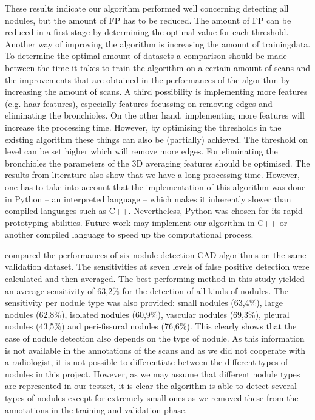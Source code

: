 These results indicate our algorithm performed well concerning detecting all
nodules, but the amount of FP has to be reduced. The amount of FP can be reduced
in a first stage by determining the optimal value for each threshold.
Another way of improving the algorithm is increasing the amount of trainingdata.
To determine the optimal amount of datasets a comparison should be made between
the time it takes to train the algorithm on a certain amount of scans and the
improvements that are obtained in the performances of the algorithm by
increasing the amount of scans. A third possibility is implementing more
features (e.g. haar features), especially features focussing on removing edges
and eliminating the bronchioles. On the other hand, implementing more features
will increase the processing time. However, by optimising the thresholds in the
existing algorithm these things can also be (partially) achieved. The threshold
on level can be set higher which will remove more edges. For eliminating the
bronchioles the parameters of the 3D averaging features should be optimised. The
results from literature also show that we have a long processing time. However,
one has to take into account that the implementation of this algorithm was done
in Python -- an interpreted language -- which makes it inherently slower than
compiled languages such as C++. Nevertheless, Python was chosen for its rapid
prototyping abilities. Future work may implement our algorithm in C++ or another
compiled language to speed up the computational process.


\cite{ginneken} compared the performances of six nodule detection CAD algorithms
on the same validation dataset. The sensitivities at seven levels of false
positive detection were calculated and then averaged. The best performing method
in this study yielded an average sensitivity of 63,2\% for the detection of all
kinds of nodules. The sensitivity per nodule type was also provided: small
nodules (63,4\%), large nodules (62,8\%), isolated nodules (60,9\%), vascular
nodules (69,3\%), pleural nodules (43,5\%) and peri-fissural nodules (76,6\%).
This clearly shows that the ease of nodule detection also depends on the type of
nodule. As this information is not available in the annotations of the scans and
as we did not cooperate with a radiologist, it is not possible to differentiate
between the different types of nodules in this project. However, as we may
assume that different nodule types are represented in our testset, it is clear
the algorithm is able to detect several types of nodules except for extremely
small ones as we removed these from the annotations in the training and
validation phase.